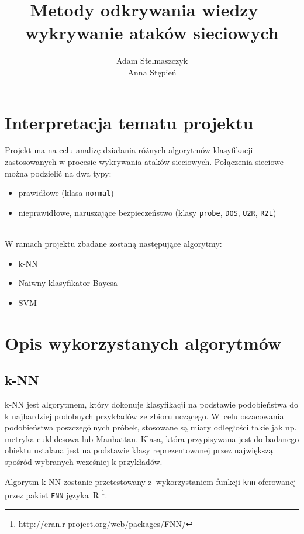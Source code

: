 \documentclass[a4paper, 12pt]{article}
\title{Metody odkrywania wiedzy -- wykrywanie ataków sieciowych}
\author{Adam Stelmaszczyk\\ Anna Stępień}
\begin{document}
\maketitle

\tableofcontents

\newpage

\section{Interpretacja tematu projektu}
Projekt ma na celu analizę działania różnych algorytmów klasyfikacji zastosowanych
w procesie wykrywania ataków sieciowych. Połączenia sieciowe można podzielić na dwa typy:
\begin{itemize}
	\item prawidłowe (klasa \texttt{normal})
	\item nieprawidłowe, naruszające bezpieczeństwo
(klasy \texttt{probe}, \texttt{DOS}, \texttt{U2R}, \texttt{R2L})
\end{itemize}
\\
W ramach projektu zbadane zostaną następujące algorytmy:
\begin{itemize}
	\item k-NN
	\item Naiwny klasyfikator Bayesa
	\item SVM
\end{itemize}

\section{Opis wykorzystanych algorytmów}\label{algorithms}

\subsection{k-NN}
k-NN jest algorytmem, który dokonuje klasyfikacji na podstawie podobieństwa do k 
najbardziej podobnych przykładów ze zbioru uczącego. W~celu oszacowania podobieństwa 
poszczególnych próbek, stosowane są miary odległości takie jak np. metryka euklidesowa lub Manhattan. 
Klasa, która przypisywana jest do badanego obiektu ustalana jest na podstawie klasy 
reprezentowanej przez największą spośród wybranych wcześniej k przykładów.

Algorytm k-NN zostanie przetestowany z~wykorzystaniem funkcji 
\texttt{knn} oferowanej przez pakiet \texttt{FNN} języka~R 
\footnote{\url{http://cran.r-project.org/web/packages/FNN/}}.
\end{document}

